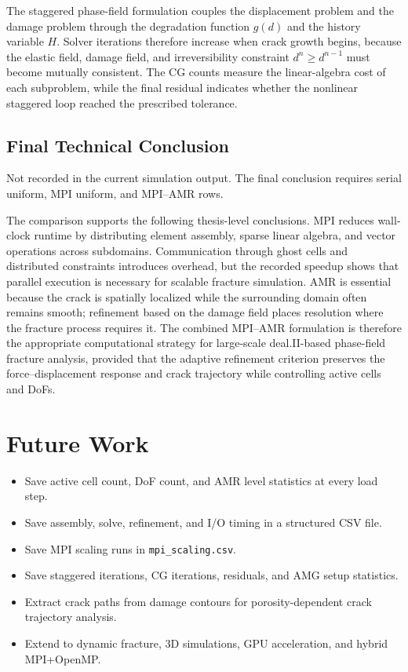 \documentclass[11pt,a4paper]{report}
\begin{document}
The staggered phase-field formulation couples the displacement problem and the damage problem through the degradation function $g(d)$ and the history variable $H$. Solver iterations therefore increase when crack growth begins, because the elastic field, damage field, and irreversibility constraint $d^n \ge d^{n-1}$ must become mutually consistent. The CG counts measure the linear-algebra cost of each subproblem, while the final residual indicates whether the nonlinear staggered loop reached the prescribed tolerance.

\section*{Final Technical Conclusion}
Not recorded in the current simulation output. The final conclusion requires serial uniform, MPI uniform, and MPI--AMR rows.

The comparison supports the following thesis-level conclusions. MPI reduces wall-clock runtime by distributing element assembly, sparse linear algebra, and vector operations across subdomains. Communication through ghost cells and distributed constraints introduces overhead, but the recorded speedup shows that parallel execution is necessary for scalable fracture simulation. AMR is essential because the crack is spatially localized while the surrounding domain often remains smooth; refinement based on the damage field places resolution where the fracture process requires it. The combined MPI--AMR formulation is therefore the appropriate computational strategy for large-scale deal.II-based phase-field fracture analysis, provided that the adaptive refinement criterion preserves the force--displacement response and crack trajectory while controlling active cells and DoFs.

\chapter{Future Work}
\begin{itemize}
\item Save active cell count, DoF count, and AMR level statistics at every load step.
\item Save assembly, solve, refinement, and I/O timing in a structured CSV file.
\item Save MPI scaling runs in \texttt{mpi\_scaling.csv}.
\item Save staggered iterations, CG iterations, residuals, and AMG setup statistics.
\item Extract crack paths from damage contours for porosity-dependent crack trajectory analysis.
\item Extend to dynamic fracture, 3D simulations, GPU acceleration, and hybrid MPI+OpenMP.
\end{itemize}
\end{document}
